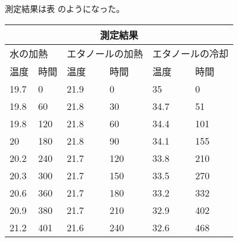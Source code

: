 \documentclass{jsarticle}
\begin{document}
測定結果は表   のようになった。


\begin{longtable}[h]
\centering
\caption{My caption}
\label{my-label}
\begin{longtable}{llllll}
\hline
\multicolumn{6}{|c|}{測定結果}                                                                                                                                 \\ \hline
\multicolumn{2}{|l|}{水の加熱}                         & \multicolumn{2}{l|}{エタノールの加熱}                     & \multicolumn{2}{l|}{エタノールの冷却}                     \\ \hline
\multicolumn{1}{|l|}{温度} & \multicolumn{1}{l|}{時間} & \multicolumn{1}{l|}{温度} & \multicolumn{1}{l|}{時間} & \multicolumn{1}{l|}{温度} & \multicolumn{1}{l|}{時間} \\ \hline
19.7                     & 0                       & 21.9                    & 0                       & 35                      & 0                       \\
19.8                     & 60                      & 21.8                    & 30                      & 34.7                    & 51                      \\
19.8                     & 120                     & 21.8                    & 60                      & 34.4                    & 101                     \\
20                       & 180                     & 21.8                    & 90                      & 34.1                    & 155                     \\
20.2                     & 240                     & 21.7                    & 120                     & 33.8                    & 210                     \\
20.3                     & 300                     & 21.7                    & 150                     & 33.5                    & 270                     \\
20.6                     & 360                     & 21.7                    & 180                     & 33.2                    & 332                     \\
20.9                     & 380                     & 21.7                    & 210                     & 32.9                    & 402                     \\
21.2                     & 401                     & 21.6                    & 240                     & 32.6                    & 468                     \\

\end{longtable}
\end{longtable}
\end{document}
